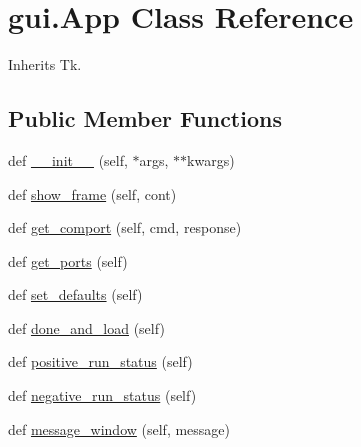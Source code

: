 \hypertarget{classgui_1_1_app}{}\section{gui.\+App Class Reference}
\label{classgui_1_1_app}


Inherits Tk.

\subsection*{Public Member Functions}
\begin{DoxyCompactItemize}
\item 
def \mbox{\hyperlink{classgui_1_1_app_a06104bbd30a404f6dcd22b9ceba6c9a5}{\+\_\+\+\_\+init\+\_\+\+\_\+}} (self, $\ast$args, $\ast$$\ast$kwargs)
\item 
def \mbox{\hyperlink{classgui_1_1_app_a876e7380c626ec624ff1c08a55253f1e}{show\+\_\+frame}} (self, cont)
\item 
def \mbox{\hyperlink{classgui_1_1_app_ab2635deb65f781dfe23d2fde7c3c93c8}{get\+\_\+comport}} (self, cmd, response)
\item 
def \mbox{\hyperlink{classgui_1_1_app_a1b5ba9c55ba86ed27afc50032e5fb41f}{get\+\_\+ports}} (self)
\item 
def \mbox{\hyperlink{classgui_1_1_app_a56ecfd60fdee6dd2e37712d15ceff922}{set\+\_\+defaults}} (self)
\item 
def \mbox{\hyperlink{classgui_1_1_app_adef694d0873e20b93827bb690e8c8925}{done\+\_\+and\+\_\+load}} (self)
\item 
def \mbox{\hyperlink{classgui_1_1_app_a22e63face73987f9e878a95ced47bbfe}{positive\+\_\+run\+\_\+status}} (self)
\item 
def \mbox{\hyperlink{classgui_1_1_app_acf736cd539fe969738a7f74d8232d2fb}{negative\+\_\+run\+\_\+status}} (self)
\item 
def \mbox{\hyperlink{classgui_1_1_app_aff435c92fd81d28c0d55ebb4ff8070cc}{message\+\_\+window}} (self, message)
\end{DoxyCompactItemize}
